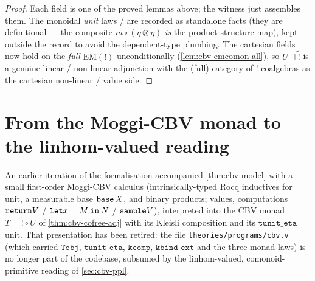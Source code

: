 \begin{proof}
Each field is one of the proved lemmas above; the witness
 just assembles them. The
monoidal \emph{unit} laws 
/  are recorded as
standalone facts (they are definitional --- the composite $m \circ (\eta
\otimes \eta)$ \emph{is} the product structure map), kept outside the
record to avoid the dependent-type plumbing. The cartesian fields now
hold on the \emph{full} $\mathrm{EM}(\mathord{!})$ unconditionally
(\autoref{lem:cbv-emcomon-all}), so $U \dashv \widetilde{\mathord{!}}$
is a genuine linear / non-linear adjunction with the (full) category of
$\mathord{!}$-coalgebras as the cartesian non-linear / value side.
\end{proof}

\section{From the Moggi-CBV monad to the linhom-valued reading}%
\label{sec:cbv-calculus}

An earlier iteration of the formalisation accompanied
\autoref{thm:cbv-model} with a small first-order Moggi-CBV calculus
(intrinsically-typed Rocq inductives for unit, a measurable base
$\mathtt{base}\,X$, and binary products; values, computations
$\mathtt{return} V$ / $\mathtt{let} x = M \mathbin{\mathtt{in}} N$ / $\mathtt{sample} V$),
interpreted into the CBV monad $T = \widetilde{\mathord{!}} \circ U$
of \autoref{thm:cbv-cofree-adj} with its Kleisli composition and
its $\mathtt{tunit\_eta}$ unit. That presentation has been retired:
the file \texttt{theories/programs/cbv.v} (which carried
$\mathtt{Tobj}$, $\mathtt{tunit\_eta}$, $\mathtt{kcomp}$, $\mathtt{kbind\_ext}$
and the three monad laws) is no longer part of the codebase, subsumed
by the linhom-valued, comonoid-primitive reading of
\autoref{sec:cbv-ppl}.

